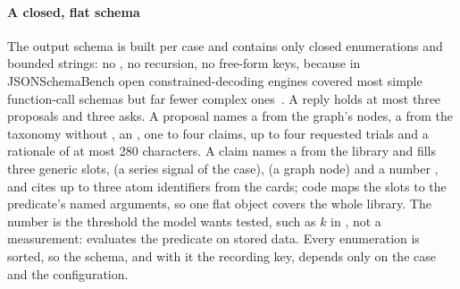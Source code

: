 \paragraph{A closed, flat schema}
The output schema is built per case and contains only closed enumerations and bounded strings: no , no recursion, no free-form keys, because in JSONSchemaBench open constrained-decoding engines covered most simple function-call schemas but far fewer complex ones~\cite{jsonschemabench2025}.
A reply holds at most three proposals and three asks.
A proposal names a  from the graph's nodes, a  from the taxonomy without , an , one to four claims, up to four requested trials and a rationale of at most 280 characters.
A claim names a  from the library and fills three generic slots,  (a series signal of the case),  (a graph node) and a number , and cites up to three atom identifiers from the cards; code maps the slots to the predicate's named arguments, so one flat object covers the whole library.
The number  is the threshold the model wants tested, such as $k$ in , not a measurement:  evaluates the predicate on stored data.
Every enumeration is sorted, so the schema, and with it the recording key, depends only on the case and the configuration.

